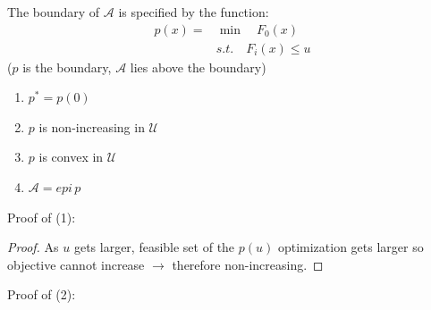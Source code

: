 The boundary of $\mathcal{A}$ is specified by the function:
\begin{align*}
p(x) = &\min \quad F_0(x)\\
&s.t. \quad F_i(x) \leq u
\end{align*}
($p$ is the boundary, $\mathcal{A}$ lies above the boundary)

\begin{enumerate}
	\item $p^* = p(0)$
	
	\item $p$ is non-increasing in $\mathcal{U}$
	
	\item $p$ is convex in $\mathcal{U}$
	
	\item $\mathcal{A} = epi\, p$
\end{enumerate}
Proof of (1): 
\begin{proof}
	As $u$ gets larger, feasible set of the $p(u)$ optimization gets larger so objective cannot increase $\rightarrow$ therefore non-increasing.
\end{proof}

Proof of (2):

